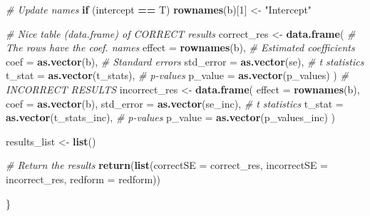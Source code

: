\documentclass[11pt,]{article}
\newenvironment{Shaded}{\begin{snugshade}}{\end{snugshade}}
\newcommand{\KeywordTok}[1]{\textcolor[rgb]{0.13,0.29,0.53}{\textbf{#1}}}
\newcommand{\DataTypeTok}[1]{\textcolor[rgb]{0.13,0.29,0.53}{#1}}
\newcommand{\DecValTok}[1]{\textcolor[rgb]{0.00,0.00,0.81}{#1}}
\newcommand{\StringTok}[1]{\textcolor[rgb]{0.31,0.60,0.02}{#1}}
\newcommand{\CommentTok}[1]{\textcolor[rgb]{0.56,0.35,0.01}{\textit{#1}}}
\newcommand{\ControlFlowTok}[1]{\textcolor[rgb]{0.13,0.29,0.53}{\textbf{#1}}}
\newcommand{\OperatorTok}[1]{\textcolor[rgb]{0.81,0.36,0.00}{\textbf{#1}}}
\newcommand{\NormalTok}[1]{#1}
\begin{document}
\begin{Shaded}
\begin{Highlighting}[]
{{{{{{{{{{{{{  \CommentTok{# Update names}
  \ControlFlowTok{if}\NormalTok{ (intercept }\OperatorTok{==}\StringTok{ }\NormalTok{T) }\KeywordTok{rownames}\NormalTok{(b)[}\DecValTok{1}\NormalTok{] <-}\StringTok{ "Intercept"}
  
  \CommentTok{# Nice table (data.frame) of CORRECT results}
\NormalTok{  correct_res <-}\StringTok{ }\KeywordTok{data.frame}\NormalTok{(}
    \CommentTok{# The rows have the coef. names}
    \DataTypeTok{effect =} \KeywordTok{rownames}\NormalTok{(b),}
    \CommentTok{# Estimated coefficients}
    \DataTypeTok{coef =} \KeywordTok{as.vector}\NormalTok{(b),}
    \CommentTok{# Standard errors}
    \DataTypeTok{std_error =} \KeywordTok{as.vector}\NormalTok{(se),}
    \CommentTok{# t statistics}
    \DataTypeTok{t_stat =} \KeywordTok{as.vector}\NormalTok{(t_stats),}
    \CommentTok{# p-values}
    \DataTypeTok{p_value =} \KeywordTok{as.vector}\NormalTok{(p_values)}
\NormalTok{    )}
  \CommentTok{# INCORRECT RESULTS}
\NormalTok{    incorrect_res <-}\StringTok{ }\KeywordTok{data.frame}\NormalTok{(}
    \DataTypeTok{effect =} \KeywordTok{rownames}\NormalTok{(b),}
    \DataTypeTok{coef =} \KeywordTok{as.vector}\NormalTok{(b),}
    \DataTypeTok{std_error =} \KeywordTok{as.vector}\NormalTok{(se_inc),}
    \CommentTok{# t statistics}
    \DataTypeTok{t_stat =} \KeywordTok{as.vector}\NormalTok{(t_stats_inc),}
    \CommentTok{# p-values}
    \DataTypeTok{p_value =} \KeywordTok{as.vector}\NormalTok{(p_values_inc)}
\NormalTok{  )}

\NormalTok{  results_list <-}\StringTok{ }\KeywordTok{list}\NormalTok{()}
  
  \CommentTok{# Return the results}
  \KeywordTok{return}\NormalTok{(}\KeywordTok{list}\NormalTok{(}\DataTypeTok{correctSE =}\NormalTok{ correct_res, }\DataTypeTok{incorrectSE =}\NormalTok{ incorrect_res, }\DataTypeTok{redform =}\NormalTok{ redform))}
  
\NormalTok{\}}

}}}}}}}}}}}}}
\end{Highlighting}
\end{Shaded}
\end{document}
